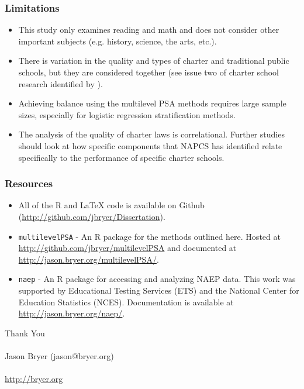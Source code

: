 \documentclass[10pt,handout,mathserif]{beamer}
\begin{document}
\begin{frame}[c]
    \frametitle{Limitations}
    \begin{itemize}
    \setlength{\itemsep}{10pt}
        \item This study only examines reading and math and does not consider other important subjects (e.g. history, science, the arts, etc.).
        \item There is variation in the quality and types of charter and traditional public schools, but they are considered together (see issue two of charter school research identified by ).
        \item Achieving balance using the multilevel PSA methods requires large sample sizes, especially for logistic regression stratification methods.
        \item The analysis of the quality of charter laws is correlational. Further studies should look at how specific components that NAPCS has identified relate specifically to the performance of specific charter schools.
    \end{itemize}
\end{frame}


\begin{frame}[c]
	\frametitle{Resources}
	\begin{itemize}
    \setlength{\itemsep}{15pt}
		\item All of the R and \LaTeX{} code is available on Github (\url{http://github.com/jbryer/Dissertation}).
		\item \texttt{multilevelPSA} - An R package for the methods outlined here. Hosted at \url{http://github.com/jbryer/multilevelPSA} and documented at \url{http://jason.bryer.org/multilevelPSA/}.
		\item \texttt{naep} - An R package for accessing and analyzing NAEP data. This work was supported by Educational Testing Services (ETS) and the National Center for Education Statistics (NCES). Documentation is available at \url{http://jason.bryer.org/naep/}.
	\end{itemize}
\end{frame}


\begin{frame}[c]
	\LARGE{Thank You}\\
	\normalsize
	\ \\
	Jason Bryer (jason@bryer.org)\\
	\ \\
	\url{http://bryer.org}\\
\end{frame}
\end{document}
